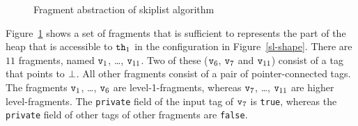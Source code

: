 \begin{figure}
\center
	
\caption{Fragment abstraction of skiplist algorithm}
\label{fig:skiplistabs}
\end{figure} 
Figure~\ref{fig:skiplistabs} shows a set of fragments that is sufficient to
represents the part of the heap that is accessible to
${\tt th}_1$ in the configuration in Figure~\ref{sl-shape}. There are $11$ fragments, named $\mathtt{v}_1$, \ldots , $\mathtt{v}_{11}$. Two of
these ($\mathtt{v}_6$, $\mathtt{v}_7$ and $\mathtt{v}_{11}$) consist of a tag that points to $\bot$. All other fragments consist of a pair of pointer-connected tags. The fragments $\mathtt{v}_1$, \ldots , $\mathtt{v}_{6}$ are  level-1-fragments, whereas $\mathtt{v}_7$, \ldots , $\mathtt{v}_{11}$ are higher level-fragments. The {\tt private} field of the input tag of $\mathtt{v}_7$ is {\tt true}, whereas the {\tt private} field of other tags of other fragments are {\tt false}.

